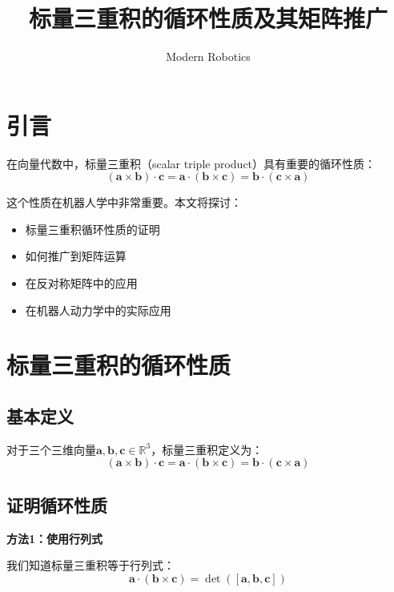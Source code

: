 \documentclass[12pt,a4paper]{article}
\title{标量三重积的循环性质及其矩阵推广}
\author{Modern Robotics}
\date{}
\begin{document}
\maketitle

\tableofcontents
\newpage

\section{引言}

在向量代数中，标量三重积（scalar triple product）具有重要的循环性质：
\begin{equation}
(\bm{a} \times \bm{b}) \cdot \bm{c} = \bm{a} \cdot (\bm{b} \times \bm{c}) = \bm{b} \cdot (\bm{c} \times \bm{a})
\label{eq:scalar_triple_cyclic}
\end{equation}

这个性质在机器人学中非常重要。本文将探讨：
\begin{itemize}
\item 标量三重积循环性质的证明
\item 如何推广到矩阵运算
\item 在反对称矩阵中的应用
\item 在机器人动力学中的实际应用
\end{itemize}

\section{标量三重积的循环性质}

\subsection{基本定义}

对于三个三维向量$\bm{a}, \bm{b}, \bm{c} \in \mathbb{R}^3$，标量三重积定义为：
\begin{equation}
(\bm{a} \times \bm{b}) \cdot \bm{c} = \bm{a} \cdot (\bm{b} \times \bm{c}) = \bm{b} \cdot (\bm{c} \times \bm{a})
\end{equation}

\subsection{证明循环性质}

\textbf{方法1：使用行列式}

我们知道标量三重积等于行列式：
\begin{equation}
\bm{a} \cdot (\bm{b} \times \bm{c}) = \det([\bm{a}, \bm{b}, \bm{c}])
\end{equation}
\end{document}
